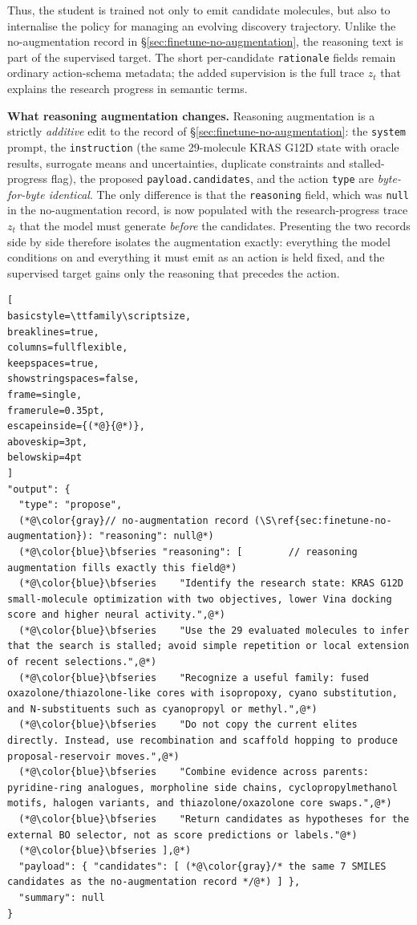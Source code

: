 Thus, the student is trained not only to emit candidate molecules, but also to internalise the policy for
managing an evolving discovery trajectory. Unlike the no-augmentation record in
\S\ref{sec:finetune-no-augmentation}, the reasoning text is part of the supervised target. The short
per-candidate \texttt{rationale} fields remain ordinary action-schema metadata; the added supervision is the
full trace $z_t$ that explains the research progress in semantic terms.

\textbf{What reasoning augmentation changes.}
Reasoning augmentation is a strictly \emph{additive} edit to the record of
\S\ref{sec:finetune-no-augmentation}: the \texttt{system} prompt, the \texttt{instruction} (the same 29-molecule
KRAS G12D state with oracle results, surrogate means and uncertainties, duplicate constraints and stalled-progress
flag), the proposed \texttt{payload.candidates}, and the action \texttt{type} are \emph{byte-for-byte identical}.
The only difference is that the \texttt{reasoning} field, which was \texttt{null} in the no-augmentation record,
is now populated with the research-progress trace $z_t$ that the model must generate \emph{before} the candidates.
Presenting the two records side by side therefore isolates the augmentation exactly: everything the model
conditions on and everything it must emit as an action is held fixed, and the supervised target gains only the
reasoning that precedes the action.

\begin{lstlisting}[
basicstyle=\ttfamily\scriptsize,
breaklines=true,
columns=fullflexible,
keepspaces=true,
showstringspaces=false,
frame=single,
framerule=0.35pt,
escapeinside={(*@}{@*)},
aboveskip=3pt,
belowskip=4pt
]
"output": {
  "type": "propose",
  (*@\color{gray}// no-augmentation record (\S\ref{sec:finetune-no-augmentation}): "reasoning": null@*)
  (*@\color{blue}\bfseries "reasoning": [        // reasoning augmentation fills exactly this field@*)
  (*@\color{blue}\bfseries    "Identify the research state: KRAS G12D small-molecule optimization with two objectives, lower Vina docking score and higher neural activity.",@*)
  (*@\color{blue}\bfseries    "Use the 29 evaluated molecules to infer that the search is stalled; avoid simple repetition or local extension of recent selections.",@*)
  (*@\color{blue}\bfseries    "Recognize a useful family: fused oxazolone/thiazolone-like cores with isopropoxy, cyano substitution, and N-substituents such as cyanopropyl or methyl.",@*)
  (*@\color{blue}\bfseries    "Do not copy the current elites directly. Instead, use recombination and scaffold hopping to produce proposal-reservoir moves.",@*)
  (*@\color{blue}\bfseries    "Combine evidence across parents: pyridine-ring analogues, morpholine side chains, cyclopropylmethanol motifs, halogen variants, and thiazolone/oxazolone core swaps.",@*)
  (*@\color{blue}\bfseries    "Return candidates as hypotheses for the external BO selector, not as score predictions or labels."@*)
  (*@\color{blue}\bfseries ],@*)
  "payload": { "candidates": [ (*@\color{gray}/* the same 7 SMILES candidates as the no-augmentation record */@*) ] },
  "summary": null
}
\end{lstlisting}

